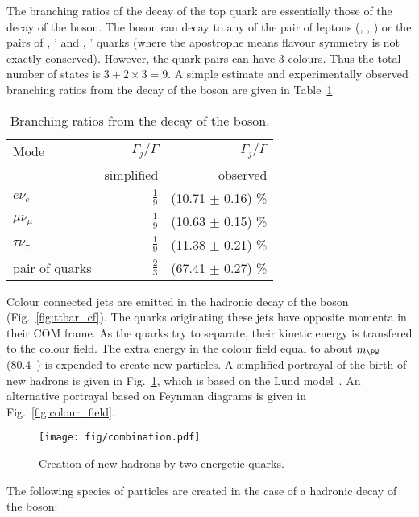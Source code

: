 The branching ratios of the decay of the top quark are essentially those of the decay of the \PW boson. The \PW boson can decay to any of the pair of leptons (\Pe\Pgne, \Pgm\Pgngm, \Pgt\Pgngt) or the pairs of \cPqu, \cPqd' and \cPqc, \cPqs' quarks (where the apostrophe means flavour symmetry is not exactly conserved). However, the quark pairs can have 3 colours. Thus the total number of states is $3+2\times3=9$. A simple estimate and experimentally observed branching ratios from the decay of the \PW boson are given in Table~\ref{tab:W_br}.

\begin{table}[h!]
  \centering
  \caption{Branching ratios from the decay of the \PW boson.}
  \label{tab:W_br}
  \begin{tabular}{l r r}
    Mode                  & $\Gamma_{j}/\Gamma$ & $\Gamma_{j}/\Gamma$\\
                          & simplified          & observed \cite{Patrignani:2016xqp}\\
    \hline
    $e\nu_{e}$            & $\frac{1}{9}$       & (10.71 $\pm$ 0.16) \%\\
    $\mu\nu_{\mu}$        & $\frac{1}{9}$       & (10.63 $\pm$ 0.15) \%\\
    $\tau\nu_{\tau}$      & $\frac{1}{9}$       & (11.38 $\pm$ 0.21) \%\\
    pair of quarks        & $\frac{2}{3}$       & (67.41 $\pm$ 0.27) \%
  \end{tabular}
\end{table}

Colour connected jets are emitted in the hadronic decay of the \PW boson (Fig.~\ref{fig:ttbar_cf}). The quarks originating these jets have opposite momenta in their COM frame. As the quarks try to separate, their kinetic energy is transfered to the colour field. The extra energy in the colour field equal to about $m_{\PW}$ (80.4~\GeV) is expended to create new particles. A simplified portrayal of the birth of new hadrons is given in Fig.~\ref{fig:combination}, which is based on the Lund model~\cite{Andersson:1983ia}. An alternative portrayal based on Feynman diagrams is given in Fig.~\ref{fig:colour_field}.

\begin{figure}[htp]
  \centering
  \texttt{[image: fig/combination.pdf]}
  \caption{Creation of new hadrons by two energetic quarks.}
  \label{fig:combination}
\end{figure}


The following species of particles are created in the case of a hadronic decay of the \PW boson:

